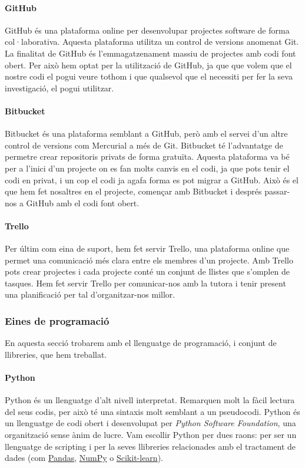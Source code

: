 \documentclass[12pt,a4paper,catalan]{article}
\begin{document}
\paragraph{GitHub}
GitHub és una plataforma online per desenvolupar projectes software de forma col·laborativa. Aquesta plataforma utilitza un control de versions anomenat Git. La finalitat de GitHub és l'emmagatzenament massiu de projectes amb codi font obert. Per això hem optat per la utilització de GitHub, ja que que volem que el nostre codi el pogui veure tothom i que qualsevol que el necessiti per fer la seva investigació, el pogui utilitzar.

\paragraph{Bitbucket}
Bitbucket és una plataforma semblant a GitHub, però amb el servei d'un altre control de versions com Mercurial a més de Git. Bitbucket té l'advantatge de permetre crear repositoris privats de forma gratuïta. Aquesta plataforma va bé per a l'inici d'un projecte on es fan molts canvis en el codi, ja que pots tenir el codi en privat, i un cop el codi ja agafa forma es pot migrar a GitHub. Això és el que hem fet nosaltres en el projecte, començar amb Bitbucket i després passar-nos a GitHub amb el codi font obert.

\paragraph{Trello}
Per últim com eina de suport, hem fet servir Trello, una plataforma online que permet una comunicació més clara entre els membres d'un projecte. Amb Trello pots crear projectes i cada projecte conté un conjunt de llistes que s'omplen de tasques. Hem fet servir Trello per comunicar-nos amb la tutora i tenir present una planificació per tal d'organitzar-nos millor.

\newpage
\subsubsection{Eines de programació}
En aquesta secció trobarem amb el llenguatge de programació, i conjunt de llibreries, que hem treballat.

\paragraph{Python}
Python és un llenguatge d'alt nivell interpretat. Remarquen molt la fàcil lectura del seus codis, per això té una sintaxis molt semblant a un pseudocodi. Python és un llenguatge de codi obert i desenvolupat per \textit{Python Software Foundation}, una organització sense ànim de lucre. Vam escollir Python per dues raons: per ser un llenguatge de scripting i per la seves llibreries relacionades amb el tractament de dades (com \hyperlink{pandas}{Pandas}, \hyperlink{numpy}{NumPy} o \hyperlink{sklearn}{Scikit-learn}).
\end{document}
